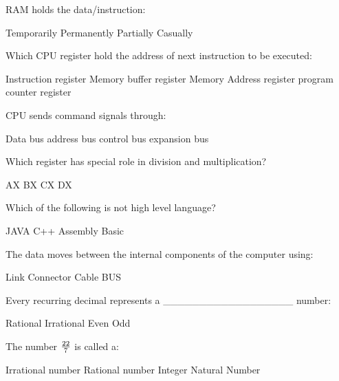\documentclass{exam}
\begin{document}
\begin{questions}
RAM holds the data/instruction:\\
\begin{oneparchoices}
\choice Temporarily
\choice Permanently
\choice Partially
\choice Casually
\end{oneparchoices}
\question 

Which  CPU register hold the address of next instruction to be executed:\\
\begin{oneparchoices}
\choice Instruction register
\choice Memory buffer register
\choice Memory Address register
\choice program counter register
\end{oneparchoices}
\question 

CPU sends command signals through:\\
\begin{oneparchoices}
\choice Data bus
\choice address bus
\choice control bus
\choice expansion bus
\end{oneparchoices}
\question 

Which register has special role in division and multiplication?\\
\begin{oneparchoices}
\choice AX
\choice BX
\choice CX
\choice DX
\end{oneparchoices}
\question 

Which of the following is not high level language?\\
\begin{oneparchoices}
\choice JAVA
\choice C++
\choice Assembly
\choice Basic
\end{oneparchoices}
\question 

The data moves between the internal components of the computer using:\\
\begin{oneparchoices}
\choice Link
\choice Connector
\choice Cable
\choice BUS
\end{oneparchoices}
\question 

Every recurring decimal represents a \_\_\_\_\_\_\_\_\_\_\_\_\_\_\_\_\_\_ number:\\
\begin{oneparchoices}
\choice Rational
\choice Irrational
\choice Even
\choice Odd
\end{oneparchoices}
\question 

The number \(22\over7\) is called a:\\
\begin{oneparchoices}
\choice Irrational number
\choice Rational number
\choice Integer
\choice Natural Number
\end{oneparchoices}
\question 


\end{questions}
\end{document}
